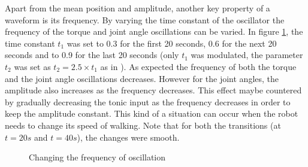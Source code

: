 \documentclass[12pt,twoside]{article}
\theoremstyle{plain}
\theoremstyle{definition}
\theoremstyle{remark}
\newcommand{\forceindent}{\leavevmode{\parindent=2em\indent}}
\begin{document}
\forceindent Apart from the mean position and amplitude, another key property of a waveform is its frequency. By varying the time constant of the oscillator the frequency of the torque and joint angle oscillations can be varied. In figure \ref{fig:change-freq}, the time constant $t_1$ was set to 0.3 for the first 20 seconds, 0.6 for the next 20 seconds and to 0.9 for the last 20 seconds (only $t_1$ was modulated, the parameter $t_2$ was set as $t_2 = 2.5 \times t_1$ as in \cite{Ronsse2009}). As expected the frequency of both the torque and the joint angle oscillations decreases. However for the joint angles, the amplitude also increases as the frequency decreases. This effect maybe countered by gradually decreasing the tonic input as the frequency decreases in order to keep the amplitude constant. This kind of a situation can occur when the robot needs to change its speed of walking. Note that for both the  transitions (at $t=20s$ and $t=40s$), the changes were smooth. 

\begin{figure}[H]
\centering     %
{}
\caption{Changing the frequency of oscillation}
\label{fig:change-freq}
\end{figure}
\end{document}
